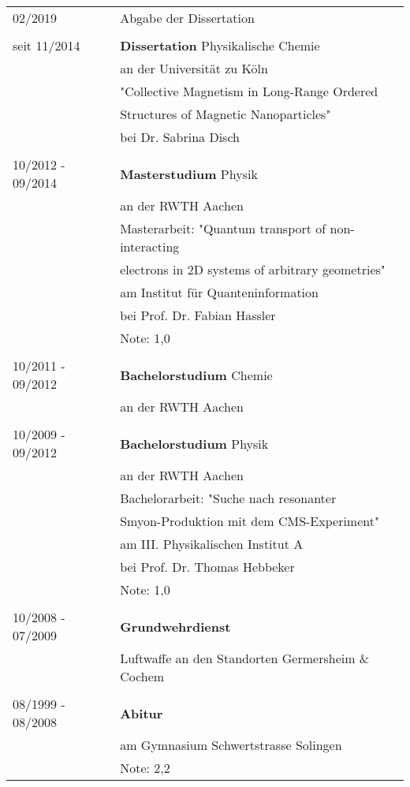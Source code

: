 \documentclass[\main/dresen_thesis.tex]{subfiles}
\begin{document}
	\begin{table}[H]
		\begin{tabular}{p{4.5cm}l}
			02/2019						& Abgabe der Dissertation\\ \\

			seit 11/2014 			& \textbf{Dissertation} Physikalische Chemie\\
												& an der Universität zu Köln \\
												& "Collective Magnetism in Long-Range Ordered\\
												&  Structures of Magnetic Nanoparticles"\\
												& bei Dr. Sabrina Disch \\ \\

			10/2012 - 09/2014 & \textbf{Masterstudium} Physik \\
												& an der RWTH Aachen \\
												& Masterarbeit: "Quantum transport of non-interacting\\
												& electrons in 2D systems of arbitrary geometries" \\
												& am Institut f\"ur Quanteninformation\\
												& bei Prof. Dr. Fabian Hassler\\
												& Note: 1,0\\ \\

			10/2011 - 09/2012 & \textbf{Bachelorstudium} Chemie \\
												& an der RWTH Aachen  \\ \\

			10/2009 - 09/2012 & \textbf{Bachelorstudium} Physik \\
											  & an der RWTH Aachen  \\
												& Bachelorarbeit: "Suche nach resonanter \\
												& Smyon-Produktion mit dem CMS-Experiment"\\
												& am III. Physikalischen Institut A\\
												& bei Prof. Dr. Thomas Hebbeker\\
												& Note: 1,0\\ \\

			10/2008 - 07/2009 & \textbf{Grundwehrdienst} \\
												& Luftwaffe an den Standorten Germersheim \& Cochem \\ \\

			08/1999 - 08/2008 & \textbf{Abitur}\\
												& am Gymnasium Schwertstrasse Solingen \\
												& Note: 2,2\\
			\end{tabular}
	\end{table}
\end{document}
